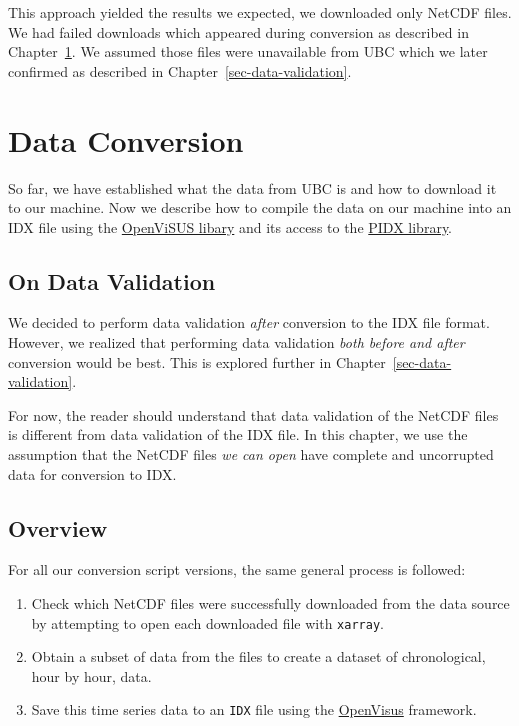 \documentclass[
  letterpaper,
  DIV=11,
  numbers=noendperiod]{scrreprt}
\providecommand{\tightlist}{%
  \setlength{\itemsep}{0pt}\setlength{\parskip}{0pt}}\usepackage{longtable,booktabs,array}
\begin{document}
This approach yielded the results we expected, we downloaded only NetCDF
files. We had failed downloads which appeared during conversion as
described in Chapter~\ref{sec-data-conversion}. We assumed those files
were unavailable from UBC which we later confirmed as described in
Chapter~\ref{sec-data-validation}.


\chapter{Data Conversion}\label{sec-data-conversion}

So far, we have established what the data from UBC is and how to
download it to our machine. Now we describe how to compile the data on
our machine into an IDX file using the
\href{https://github.com/sci-visus/OpenVisus/tree/master}{OpenViSUS
libary} and its access to the
\href{https://github.com/sci-visus/PIDX?tab=readme-ov-file}{PIDX
library}.

\section{On Data Validation}\label{on-data-validation}

We decided to perform data validation \emph{after} conversion to the IDX
file format. However, we realized that performing data validation
\emph{both before and after} conversion would be best. This is explored
further in Chapter~\ref{sec-data-validation}.

For now, the reader should understand that data validation of the NetCDF
files is different from data validation of the IDX file. In this
chapter, we use the assumption that the NetCDF files \emph{we can open}
have complete and uncorrupted data for conversion to IDX.

\section{Overview}\label{overview-1}

For all our conversion script versions, the same general process is
followed:

\begin{enumerate}
\def\labelenumi{\arabic{enumi}.}
\tightlist
\item
  Check which NetCDF files were successfully downloaded from the data
  source by attempting to open each downloaded file with
  \texttt{xarray}.
\item
  Obtain a subset of data from the files to create a dataset of
  chronological, hour by hour, data.
\item
  Save this time series data to an \texttt{IDX} file using the
  \href{https://github.com/sci-visus/OpenVisus/tree/master}{OpenVisus}
  framework.
\end{enumerate}
\end{document}
